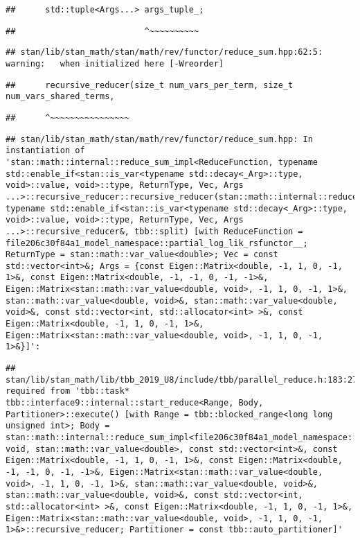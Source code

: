 \documentclass[
]{article}
\begin{document}
\begin{verbatim}
##      std::tuple<Args...> args_tuple_;
\end{verbatim}

\begin{verbatim}
##                          ^~~~~~~~~~~
\end{verbatim}

\begin{verbatim}
## stan/lib/stan_math/stan/math/rev/functor/reduce_sum.hpp:62:5: warning:   when initialized here [-Wreorder]
\end{verbatim}

\begin{verbatim}
##      recursive_reducer(size_t num_vars_per_term, size_t num_vars_shared_terms,
\end{verbatim}

\begin{verbatim}
##      ^~~~~~~~~~~~~~~~~
\end{verbatim}

\begin{verbatim}
## stan/lib/stan_math/stan/math/rev/functor/reduce_sum.hpp: In instantiation of 'stan::math::internal::reduce_sum_impl<ReduceFunction, typename std::enable_if<stan::is_var<typename std::decay<_Arg>::type, void>::value, void>::type, ReturnType, Vec, Args ...>::recursive_reducer::recursive_reducer(stan::math::internal::reduce_sum_impl<ReduceFunction, typename std::enable_if<stan::is_var<typename std::decay<_Arg>::type, void>::value, void>::type, ReturnType, Vec, Args ...>::recursive_reducer&, tbb::split) [with ReduceFunction = file206c30f84a1_model_namespace::partial_log_lik_rsfunctor__; ReturnType = stan::math::var_value<double>; Vec = const std::vector<int>&; Args = {const Eigen::Matrix<double, -1, 1, 0, -1, 1>&, const Eigen::Matrix<double, -1, -1, 0, -1, -1>&, Eigen::Matrix<stan::math::var_value<double, void>, -1, 1, 0, -1, 1>&, stan::math::var_value<double, void>&, stan::math::var_value<double, void>&, const std::vector<int, std::allocator<int> >&, const Eigen::Matrix<double, -1, 1, 0, -1, 1>&, Eigen::Matrix<stan::math::var_value<double, void>, -1, 1, 0, -1, 1>&}]':
\end{verbatim}

\begin{verbatim}
## stan/lib/stan_math/lib/tbb_2019_U8/include/tbb/parallel_reduce.h:183:27:   required from 'tbb::task* tbb::interface9::internal::start_reduce<Range, Body, Partitioner>::execute() [with Range = tbb::blocked_range<long long unsigned int>; Body = stan::math::internal::reduce_sum_impl<file206c30f84a1_model_namespace::partial_log_lik_rsfunctor__, void, stan::math::var_value<double>, const std::vector<int>&, const Eigen::Matrix<double, -1, 1, 0, -1, 1>&, const Eigen::Matrix<double, -1, -1, 0, -1, -1>&, Eigen::Matrix<stan::math::var_value<double, void>, -1, 1, 0, -1, 1>&, stan::math::var_value<double, void>&, stan::math::var_value<double, void>&, const std::vector<int, std::allocator<int> >&, const Eigen::Matrix<double, -1, 1, 0, -1, 1>&, Eigen::Matrix<stan::math::var_value<double, void>, -1, 1, 0, -1, 1>&>::recursive_reducer; Partitioner = const tbb::auto_partitioner]'
\end{verbatim}
\end{document}
